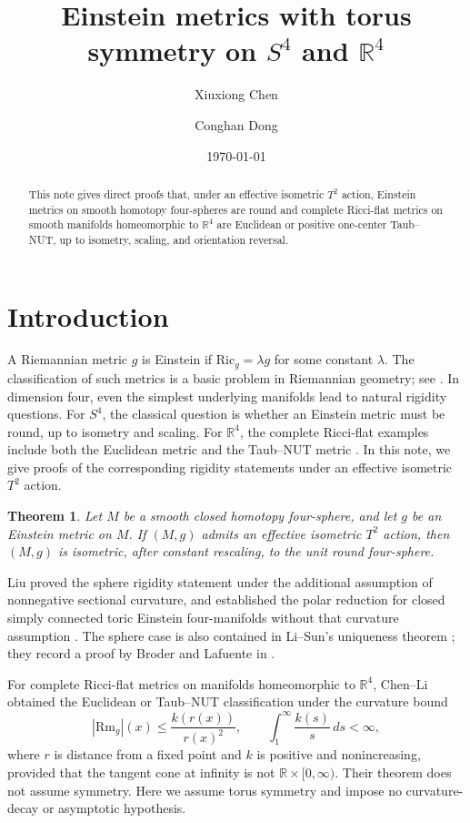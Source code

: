 \documentclass[letterpaper]{amsart}
\title{Einstein metrics with torus symmetry on $S^4$ and $\mathbb R^4$}
\author{Xiuxiong Chen}
\author{Conghan Dong}
\newtheorem{thm}{Theorem}[section]
\theoremstyle{definition}
\theoremstyle{remark}
\begin{document}
\date{\today}

\begin{abstract}
This note gives direct proofs that, under an effective isometric $T^2$ action,
Einstein metrics on smooth homotopy four-spheres are round and complete
Ricci-flat metrics on smooth manifolds homeomorphic to $\mathbb R^4$ are
Euclidean or positive one-center Taub--NUT, up to isometry, scaling, and
orientation reversal. 
\end{abstract}

\maketitle

\section{Introduction}
A Riemannian metric $g$ is Einstein if $\mathrm{Ric}_g=\lambda g$ for
some constant $\lambda$. The classification of such metrics is a basic
problem in Riemannian geometry; see \cite{notes-Besse}. In dimension four,
even the simplest underlying manifolds lead to natural rigidity
questions. For $S^4$, the classical question is whether an Einstein
metric must be round, up to isometry and scaling. For $\mathbb R^4$,
the complete Ricci-flat examples include both the Euclidean metric and
the Taub--NUT metric \cite{notes-Hawking,notes-GibbonsHawking}.
In this note, we give proofs of the corresponding rigidity statements
under an effective isometric $T^2$ action.

\begin{thm}\label{thm-sphere}
Let $M$ be a smooth closed homotopy four-sphere, and let $g$ be an Einstein metric
on $M$. If $(M,g)$ admits an effective isometric $T^2$ action, then $(M,g)$
is isometric, after constant rescaling, to the unit round four-sphere.
\end{thm}

Liu proved the sphere rigidity statement under the additional assumption
of nonnegative sectional curvature, and established the polar reduction
for closed simply connected toric Einstein four-manifolds without that
curvature assumption \cite[Theorems~1.1--1.2]{notes-Liu}.
The sphere case is also contained in Li--Sun's uniqueness theorem
\cite[Theorem~1.5]{notes-LiSunCompact}; they record a proof by Broder and
Lafuente in \cite[Remark~D.19]{notes-LiSunCompact}.

For complete Ricci-flat metrics on manifolds homeomorphic to
$\mathbb R^4$, Chen--Li \cite[Theorem~1.6]{notes-ChenLi} obtained the
Euclidean or Taub--NUT classification under the curvature bound
\[
 |\mathrm{Rm}_g|(x)\leq\frac{k(r(x))}{r(x)^2},
 \qquad
 \int_1^\infty\frac{k(s)}{s}\,ds<\infty,
\]
where $r$ is distance from a fixed point and $k$ is positive and
nonincreasing, provided that the tangent cone at infinity is not
$\mathbb R\times[0,\infty)$. Their theorem does not assume symmetry.
Here we assume torus symmetry and impose no curvature-decay or
asymptotic hypothesis.
\end{document}
